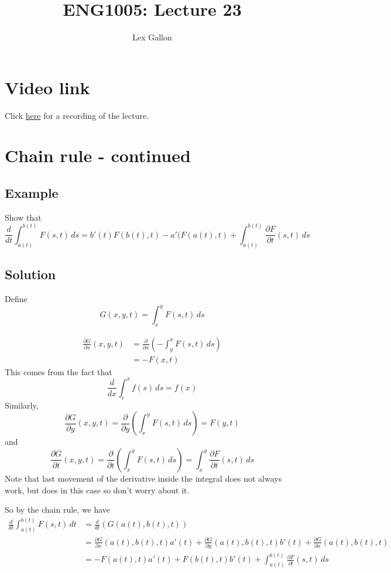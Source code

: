 \documentclass[11pt]{article}
\begin{document}
\title{ENG1005: Lecture 23}
\author{Lex Gallon}
\maketitle

\tableofcontents

\section*{Video link}
Click \href{https://echo360.org.au/lesson/G_32340f5d-ff38-43d2-be9d-d88ddb1b3611_b944cecf-8ba5-40d3-a870-0243a0a9e78c_2020-05-13T14:58:00.000_2020-05-13T15:53:00.000/classroom#sortDirection=desc}{here} for a recording of the lecture.

\section{Chain rule - continued}

\subsection{Example}
Show that
\[ \frac{d}{dt} \int_{a(t)}^{b(t)} F(s, t)\, ds = b'(t) F(b(t), t) - a'(F(a(t), t) + \int_{a(t)}^{b(t)} \frac{\partial F}{\partial t} (s, t)\, ds \]

\subsection{Solution}
Define
\[ G(x, y, t) = \int_x^y F(s, t) \, ds \]

\begin{align*}
\frac{\partial G}{\partial x} (x, y, t) &= \frac{\partial}{\partial x} \left( -\int_y^x F(s, t)\, ds \right) \\
&= -F(x, t)
\end{align*}
This comes from the fact that
\[ \frac{d}{dx} \int_c^x f(s)\, ds = f(x) \]
Similarly,
\[ \frac{\partial G}{\partial y}(x, y, t) = \frac{\partial}{\partial y} \left( \int_x^y F(s, t)\, ds \right) = F(y, t) \]
and
\[ \frac{\partial G}{\partial t}(x, y, t) = \frac{\partial}{\partial t} \left( \int_x^y F(s, t)\, ds \right) = \int_x^y \frac{\partial F}{\partial t}(s, t)\,  ds \]
Note that last movement of the derivative inside the integral does not always work, but does in this case so don't worry about it.

So by the chain rule, we have 
\begin{align*}
\frac{d}{dt} \int_{a(t)}^{b(t)} F(s, t)\, dt &= \frac{d}{dt} \left(G(a(t), b(t), t) \right) \\
&= \frac{\partial G}{\partial x}(a(t), b(t), t) a'(t) + \frac{\partial G}{\partial y}(a(t), b(t), t) b'(t) + \frac{\partial G}{\partial x}(a(t), b(t), t) \\
&= -F(a(t), t) a'(t) + F(b(t), t) b'(t) + \int_{a(t)}^{b(t)} \frac{\partial F}{\partial t}(s, t)\, ds
\end{align*}
\end{document}
